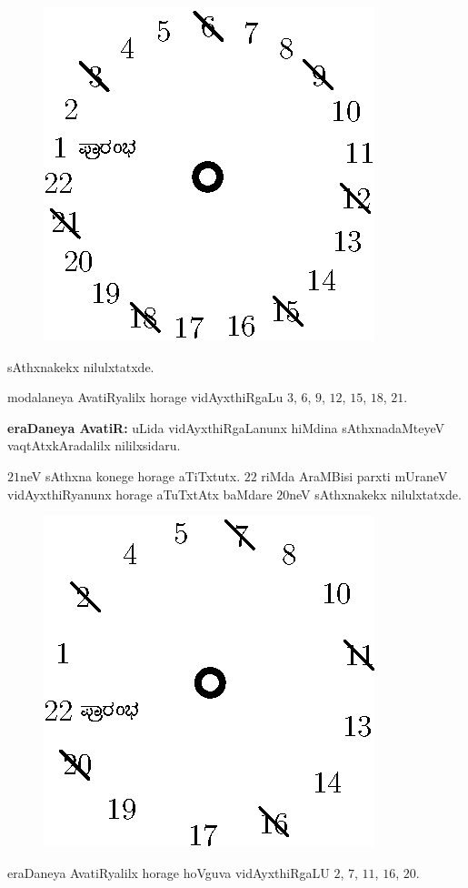 \begin{figure}[H]
\centering
\includegraphics{src/figures/fig9.eps}
\end{figure}
 sAthxnakekx nilulxtatxde.

modalaneya AvatiRyalilx horage vidAyxthiRgaLu $3$, $6$, $9$, $12$, $15$, $18$, $21$.

{\bf eraDaneya AvatiR:} uLida vidAyxthiRgaLanunx hiMdina sAthxnadaMteyeV vaqtAtxkAradalilx nililxsidaru.

$21$neV sAthxna konege horage aTiTxtutx. $22$ riMda AraMBisi parxti mUraneV vidAyxthiRyanunx horage aTuTxtAtx baMdare $20$neV sAthxnakekx nilulxtatxde. 
\begin{figure}[H]
\centering
\includegraphics{src/figures/fig10.eps}
\end{figure}
eraDaneya AvatiRyalilx horage hoVguva vidAyxthiRgaLU $2$, $7$, $11$, $16$, $20$.

